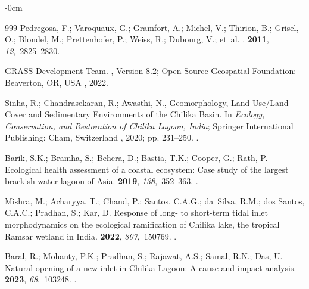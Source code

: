 \documentclass[jmse,article,accept,pdftex,oneauthor]{Definitions/mdpi}
\begin{document}
\begin{adjustwidth}{-\extralength}{0cm}
\begin{thebibliography}{999}
Pedregosa, F.; Varoquaux, G.; Gramfort, A.; Michel, V.; Thirion, B.; Grisel,
  O.; Blondel, M.; Prettenhofer, P.; Weiss, R.; Dubourg, V.;  et~al.
.
 {\bf 2011}, {\em
  12},~2825--2830.

{GRASS Development Team}.
, Version 8.2; Open Source Geospatial Foundation: {Beaverton, OR, USA} 
,  2022.

Sinha, R.; Chandrasekaran, R.; Awasthi, N., Geomorphology, Land Use/Land Cover
  and Sedimentary Environments of the Chilika Basin.
\newblock In {\em Ecology, Conservation, and Restoration of Chilika Lagoon,
  India}; Springer International Publishing: Cham, Switzerland 
, 2020; pp. 231--250.
.

Barik, S.K.; Bramha, S.; Behera, D.; Bastia, T.K.; Cooper, G.; Rath, P.
\newblock Ecological health assessment of a coastal ecosystem: Case study of
  the largest brackish water lagoon of Asia.
 {\bf 2019}, {\em 138},~352--363.
.

Mishra, M.; Acharyya, T.; Chand, P.; Santos, C.A.G.; da~Silva, R.M.; dos
  Santos, C.A.C.; Pradhan, S.; Kar, D.
\newblock Response of long- to short-term tidal inlet morphodynamics on the
  ecological ramification of Chilika lake, the tropical Ramsar wetland in
  India.
 {\bf 2022}, {\em 807},~150769.
.

Baral, R.; Mohanty, P.K.; Pradhan, S.; Rajawat, A.S.; Samal, R.N.; Das, U.
\newblock Natural opening of a new inlet in Chilika Lagoon: A cause and impact
  analysis.
 {\bf 2023}, {\em
  68},~103248.
.


\end{thebibliography}
\end{adjustwidth}
\end{document}

